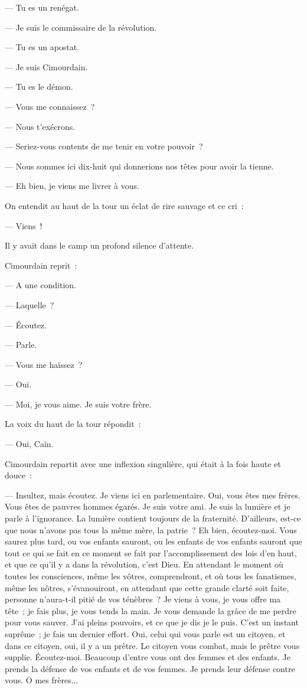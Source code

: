 \documentclass[french,twoside]{book} %
\begin{document}
— Tu es un renégat.\par
— Je suis le commissaire de la révolution.\par
— Tu es un apostat.\par
— Je suis Cimourdain.\par
— Tu es le démon.\par
— Vous me connaissez ?\par
— Nous t’exécrons.\par
— Seriez-vous contents de me tenir en votre pouvoir ?\par
— Nous sommes ici dix-huit qui donnerions nos têtes pour avoir la tienne.\par
— Eh bien, je viens me livrer à vous.\par
On entendit au haut de la tour un éclat de rire sauvage et ce cri :\par
— Viens !\par
Il y avait dans le camp un profond silence d’attente.\par
Cimourdain reprit :\par
— A une condition.\par
— Laquelle ?\par
— Écoutez.\par
— Parle.\par
— Vous me haïssez ?\par
— Oui.\par
— Moi, je vous aime. Je suis votre frère.\par
La voix du haut de la tour répondit :\par
— Oui, Caïn.\par
 Cimourdain repartit avec une inflexion singulière, qui était à la fois haute et douce :\par
— Insultez, mais écoutez. Je viens ici en parlementaire. Oui, vous êtes mes frères. Vous êtes de pauvres hommes égarés. Je suis votre ami. Je suis la lumière et je parle à l’ignorance. La lumière contient toujours de la fraternité. D’ailleurs, est-ce que nous n’avons pas tous la même mère, la patrie ? Eh bien, écoutez-moi. Vous saurez plus tard, ou vos enfants sauront, ou les enfants de vos enfants sauront que tout ce qui se fait en ce moment se fait par l’accomplissement des lois d’en haut, et que ce qu’il y a dans la révolution, c’est Dieu. En attendant le moment où toutes les consciences, même les vôtres, comprendront, et où tous les fanatismes, même les nôtres, s’évanouiront, en attendant que cette grande clarté soit faite, personne n’aura-t-il pitié de vos ténèbres ? Je viens à vous, je vous offre ma tête ; je fais plus, je vous tends la main. Je vous demande la grâce de me perdre pour vous sauver. J’ai pleins pouvoirs, et ce que je dis je le puis. C’est un instant suprême ; je fais un dernier effort. Oui, celui qui vous parle est un citoyen, et dans ce citoyen, oui, il y a un prêtre. Le citoyen vous combat, mais le prêtre vous supplie. Écoutez-moi. Beaucoup d’entre vous ont des femmes et des enfants. Je prends la défense de vos enfants et de vos femmes. Je prends leur défense contre vous. O mes frères...\par
\end{document}
